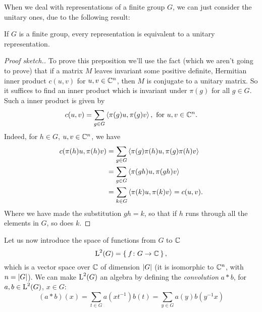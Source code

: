 When we deal with representations of a finite group $G$, we can just consider the unitary ones, due to the following result:
\begin{prop}
\label{unit:eqiv}
If $G$ is a finite group, every representation is equivalent to a unitary representation.
\end{prop}
\begin{proof}[Proof sketch.]
To prove this preposition we'll use the fact (which we aren't going to prove) that if a matrix $M$ leaves invariant some positive definite, Hermitian inner product $c(u,v)$ for $u,v \in {\mathbb C}^n$, then $M$ is conjugate to a unitary matrix.
So it suffices to find an inner product which is invariant under $\pi(g)$ for all $g \in G$. Such a inner product is given by 
\[
c(u,v)= \sum_{g \in G} \Braket{ \pi(g)u, \pi(g)v } , \text{ for } u,v \in {\mathbb C}^n.
\]
Indeed, for $h\in G$, $u,v\in {\mathbb C}^n$, we have
\[
\begin{split}
c(\pi(h)u,\pi(h)v) &= \sum_{g \in G} \Braket{ \pi(g)\pi(h)u, \pi(g)\pi(h)v } \\
&=\sum_{g \in G} \Braket{ \pi(gh)u, \pi(gh)v } \\
&=\sum_{k \in G} \Braket{ \pi(k)u, \pi(k)v }= c(u,v).\\
\end{split}
\]
Where we have made the substitution $gh=k$, so that if $h$ runs through all the elements in $G$, so does $k$. 
\end{proof}
Let us now introduce  the space of functions from $G$ to ${\mathbb C}$ 
\begin{equation*}
\operatorname{L}^2(G)=\Set{f\colon G \rightarrow {\mathbb C}},
\end{equation*}
which is a vector space over ${\mathbb C}$ of dimension $\lvert G\rvert$ (it is isomorphic to ${\mathbb C}^n$, with $n=\lvert G\rvert$).
We can make $\operatorname{L}^2(G)$ an algebra by defining the \emph{convolution} $a\ast b$, for $a,b\in \operatorname{L}^2(G)$, $x\in G$:
\begin{equation*}
(a\ast b)(x)=\sum_{t \in G} a(xt^{-1})b(t)=\sum_{y \in G} a(y)b(y^{-1}x)
\end{equation*}
